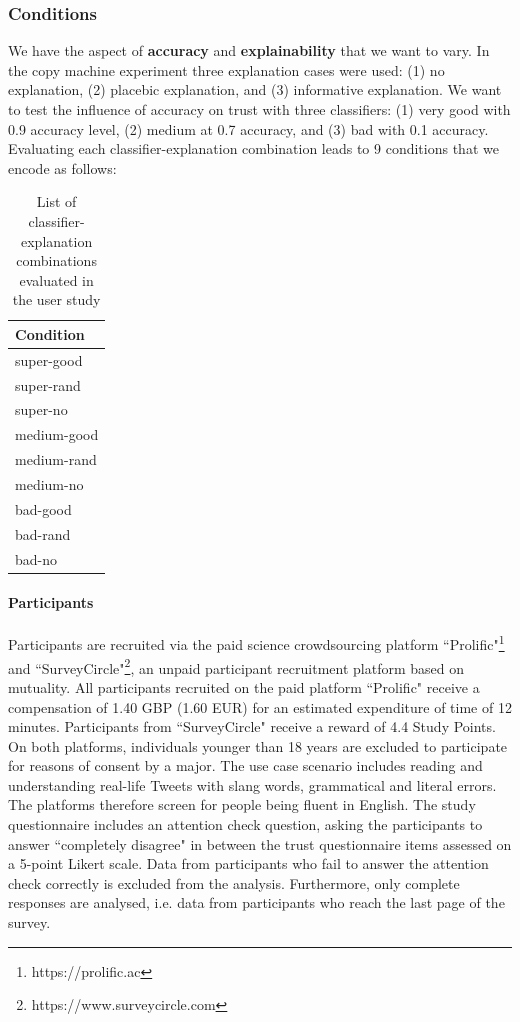 \subsubsection{Conditions}
We have the aspect of \textbf{accuracy} and \textbf{explainability} that we want to vary. In the copy machine experiment \cite{langer1978mindlessness} three explanation cases were used: (1) no explanation, (2) placebic explanation, and (3) informative explanation. We want to test the influence of accuracy on trust with three classifiers: (1) very good with 0.9 accuracy level, (2) medium at 0.7 accuracy, and (3) bad with 0.1 accuracy. Evaluating each classifier-explanation combination leads to 9 conditions that we encode as follows:
\begin{table}[H]
	\centering
	\begin{tabular}{l}
		\textbf{Condition}\\ \midrule
		super-good\\
		super-rand\\
		super-no\\
		medium-good\\
		medium-rand\\
		medium-no\\
		bad-good\\
		bad-rand\\
		bad-no\\ \bottomrule
	\end{tabular}
	\caption{List of classifier-explanation combinations evaluated in the user study}
	\label{tab:conditions}
\end{table}

\paragraph{Participants}
Participants are recruited via the paid science crowdsourcing platform ``Prolific"\footnote{https://prolific.ac} and ``SurveyCircle"\footnote{https://www.surveycircle.com}, an unpaid participant recruitment platform based on mutuality. All participants recruited on the paid platform ``Prolific" receive a compensation of 1.40 GBP (1.60 EUR) for an estimated expenditure of time of 12 minutes. Participants from ``SurveyCircle" receive a reward of 4.4 Study Points. On both platforms, individuals younger than 18 years are excluded to participate for reasons of consent by a major. The use case scenario includes reading and understanding real-life Tweets with slang words, grammatical and literal errors. The platforms therefore screen for people being fluent in English. The study questionnaire includes an attention check question, asking the participants to answer ``completely disagree" in between the trust questionnaire items assessed on a 5-point Likert scale. Data from participants who fail to answer the attention check correctly is excluded from the analysis. Furthermore, only complete responses are analysed, i.e. data from participants who reach the last page of the survey. 

